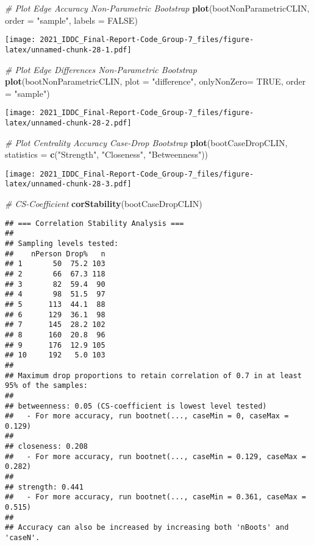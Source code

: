 \documentclass[
]{article}
\newenvironment{Shaded}{\begin{snugshade}}{\end{snugshade}}
\newcommand{\CommentTok}[1]{\textcolor[rgb]{0.56,0.35,0.01}{\textit{#1}}}
\newcommand{\DataTypeTok}[1]{\textcolor[rgb]{0.13,0.29,0.53}{#1}}
\newcommand{\KeywordTok}[1]{\textcolor[rgb]{0.13,0.29,0.53}{\textbf{#1}}}
\newcommand{\NormalTok}[1]{#1}
\newcommand{\OtherTok}[1]{\textcolor[rgb]{0.56,0.35,0.01}{#1}}
\newcommand{\StringTok}[1]{\textcolor[rgb]{0.31,0.60,0.02}{#1}}
\begin{document}
\begin{Shaded}
\begin{Highlighting}[]
\CommentTok{# Plot Edge Accuracy Non-Parametric Bootstrap}
\KeywordTok{plot}\NormalTok{(bootNonParametricCLIN,}
     \DataTypeTok{order =} \StringTok{"sample"}\NormalTok{,}
     \DataTypeTok{labels =} \OtherTok{FALSE}\NormalTok{)}
\end{Highlighting}
\end{Shaded}

\texttt{[image: 2021\_IDDC\_Final-Report-Code\_Group-7\_files/figure-latex/unnamed-chunk-28-1.pdf]}

\begin{Shaded}
\begin{Highlighting}[]
\CommentTok{# Plot Edge Differences Non-Parametric Bootstrap}
\KeywordTok{plot}\NormalTok{(bootNonParametricCLIN,}
     \DataTypeTok{plot =} \StringTok{"difference"}\NormalTok{,}
     \DataTypeTok{onlyNonZero=} \OtherTok{TRUE}\NormalTok{,}
     \DataTypeTok{order =} \StringTok{"sample"}\NormalTok{)}
\end{Highlighting}
\end{Shaded}

\texttt{[image: 2021\_IDDC\_Final-Report-Code\_Group-7\_files/figure-latex/unnamed-chunk-28-2.pdf]}

\begin{Shaded}
\begin{Highlighting}[]
\CommentTok{# Plot Centrality Accuracy Case-Drop Bootstrap}
\KeywordTok{plot}\NormalTok{(bootCaseDropCLIN,}
     \DataTypeTok{statistics =} \KeywordTok{c}\NormalTok{(}\StringTok{"Strength"}\NormalTok{, }\StringTok{"Closeness"}\NormalTok{, }\StringTok{"Betweenness"}\NormalTok{))}
\end{Highlighting}
\end{Shaded}

\texttt{[image: 2021\_IDDC\_Final-Report-Code\_Group-7\_files/figure-latex/unnamed-chunk-28-3.pdf]}

\begin{Shaded}
\begin{Highlighting}[]
\CommentTok{# CS-Coefficient}
\KeywordTok{corStability}\NormalTok{(bootCaseDropCLIN)}
\end{Highlighting}
\end{Shaded}

\begin{verbatim}
## === Correlation Stability Analysis === 
## 
## Sampling levels tested:
##    nPerson Drop%   n
## 1       50  75.2 103
## 2       66  67.3 118
## 3       82  59.4  90
## 4       98  51.5  97
## 5      113  44.1  88
## 6      129  36.1  98
## 7      145  28.2 102
## 8      160  20.8  96
## 9      176  12.9 105
## 10     192   5.0 103
## 
## Maximum drop proportions to retain correlation of 0.7 in at least 95% of the samples:
## 
## betweenness: 0.05 (CS-coefficient is lowest level tested)
##   - For more accuracy, run bootnet(..., caseMin = 0, caseMax = 0.129) 
## 
## closeness: 0.208 
##   - For more accuracy, run bootnet(..., caseMin = 0.129, caseMax = 0.282) 
## 
## strength: 0.441 
##   - For more accuracy, run bootnet(..., caseMin = 0.361, caseMax = 0.515) 
## 
## Accuracy can also be increased by increasing both 'nBoots' and 'caseN'.
\end{verbatim}
\end{document}
